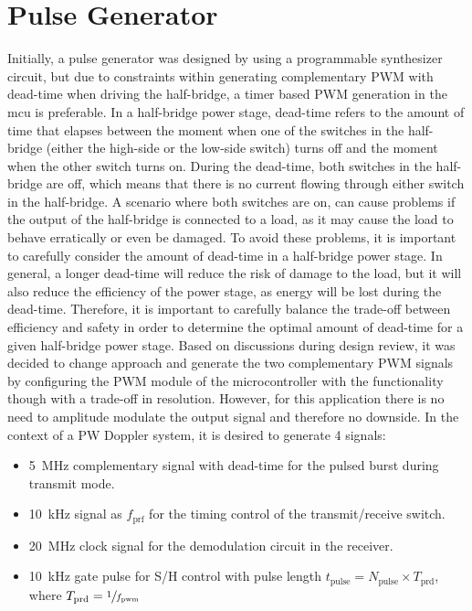 \section{Pulse Generator}
Initially, a pulse generator was designed by using a programmable synthesizer circuit, but due to constraints within generating complementary PWM with dead-time when driving the half-bridge, a timer based PWM generation in the \gls{mcu} is preferable. In a half-bridge power stage, dead-time refers to the amount of time that elapses between the moment when one of the switches in the half-bridge (either the high-side or the low-side switch) turns off and the moment when the other switch turns on. During the dead-time, both switches in the half-bridge are off, which means that there is no current flowing through either switch in the half-bridge. A scenario where both switches are on, can cause problems if the output of the half-bridge is connected to a load, as it may cause the load to behave erratically or even be damaged. To avoid these problems, it is important to carefully consider the amount of dead-time in a half-bridge power stage. In general, a longer dead-time will reduce the risk of damage to the load, but it will also reduce the efficiency of the power stage, as energy will be lost during the dead-time. Therefore, it is important to carefully balance the trade-off between efficiency and safety in order to determine the optimal amount of dead-time for a given half-bridge power stage. Based on discussions during design review, it was decided to change approach and generate the two complementary PWM signals by configuring the PWM module of the microcontroller with the functionality though with a trade-off in resolution. However, for this application there is no need to amplitude modulate the output signal and therefore no downside.
In the context of a PW Doppler system, it is desired to generate 4 signals:
\begin{itemize}
	\item \qty{5}{\mega\hertz} complementary signal with dead-time for the pulsed burst during transmit mode.
	\item \qty{10}{\kilo\hertz} signal as $f_{\mathrm{prf}}$ for the timing control of the transmit/receive switch.
	\item \qty{20}{\mega\hertz} clock signal for the demodulation circuit in the receiver.
	\item \qty{10}{\kilo\hertz} gate pulse for S/H control with pulse length $t_{\mathrm{pulse}} = N_{\mathrm{pulse}} \times T_{\mathrm{prd}}$, where $T_{\mathrm{prd}} = \sfrac{1}{f_{\mathrm{pwm}}}$
\end{itemize}

